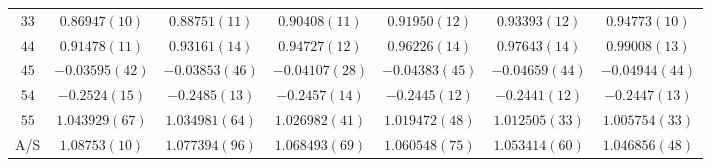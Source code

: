 \begin{table}
\begin{center}
\begin{tabular}{c|c c c c c c}
$33$ & $0.86947(10)$ & $0.88751(11)$ & $0.90408(11)$ & $0.91950(12)$ & $0.93393(12)$ & $0.94773(10)$ \\
$44$ & $0.91478(11)$ & $0.93161(14)$ & $0.94727(12)$ & $0.96226(14)$ & $0.97643(14)$ & $0.99008(13)$ \\
$45$ & $-0.03595(42)$ & $-0.03853(46)$ & $-0.04107(28)$ & $-0.04383(45)$ & $-0.04659(44)$ & $-0.04944(44)$ \\
$54$ & $-0.2524(15)$ & $-0.2485(13)$ & $-0.2457(14)$ & $-0.2445(12)$ & $-0.2441(12)$ & $-0.2447(13)$ \\
$55$ & $1.043929(67)$ & $1.034981(64)$ & $1.026982(41)$ & $1.019472(48)$ & $1.012505(33)$ & $1.005754(33)$ \\
\hline
A/S & $1.08753(10)$ & $1.077394(96)$ & $1.068493(69)$ & $1.060548(75)$ & $1.053414(60)$ & $1.046856(48)$ \\
\hline
\hline
\end{tabular}
\end{center}
\end{table}